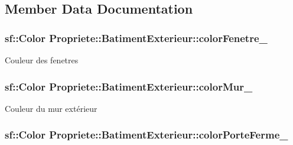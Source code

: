 \subsection{Member Data Documentation}
\hypertarget{classPropriete_1_1BatimentExterieur_a492ecfea288daf7efcac083b1438bc55}{
\subsubsection[{color\-Fenetre\-\_\-}]{\setlength{\rightskip}{0pt plus 5cm}sf\-::\-Color Propriete\-::\-Batiment\-Exterieur\-::color\-Fenetre\-\_\-\hspace{0.3cm}{\ttfamily [private]}}}\label{classPropriete_1_1BatimentExterieur_a492ecfea288daf7efcac083b1438bc55}
Couleur des fenetres \hypertarget{classPropriete_1_1BatimentExterieur_a7523a785bb99875e7038bb87630f5c58}{
\subsubsection[{color\-Mur\-\_\-}]{\setlength{\rightskip}{0pt plus 5cm}sf\-::\-Color Propriete\-::\-Batiment\-Exterieur\-::color\-Mur\-\_\-\hspace{0.3cm}{\ttfamily [private]}}}\label{classPropriete_1_1BatimentExterieur_a7523a785bb99875e7038bb87630f5c58}
Couleur du mur extérieur \hypertarget{classPropriete_1_1BatimentExterieur_a90b914503c502b03a45a11dc088347ab}{
\subsubsection[{color\-Porte\-Ferme\-\_\-}]{\setlength{\rightskip}{0pt plus 5cm}sf\-::\-Color Propriete\-::\-Batiment\-Exterieur\-::color\-Porte\-Ferme\-\_\-\hspace{0.3cm}{\ttfamily [private]}}}\label{classPropriete_1_1BatimentExterieur_a90b914503c502b03a45a11dc088347ab}
